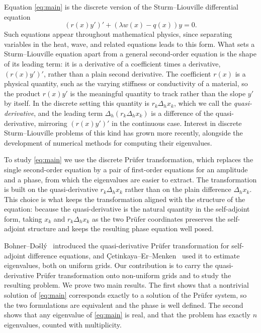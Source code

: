 \documentclass[12pt,reqno]{amsart}
\numberwithin{equation}{section}
\begin{document}
Equation \eqref{eq:main} is the discrete version of the Sturm--Liouville differential equation
\[
(r(x)y')' + \left(\lambda w(x) - q(x)\right) y = 0.
\]
Such equations appear throughout mathematical physics, since separating variables in the heat, wave, and related equations leads to this form. What sets a Sturm--Liouville equation apart from a general second-order equation is the shape of its leading term: it is a derivative of a coefficient times a derivative, $(r(x)y')'$, rather than a plain second derivative. The coefficient $r(x)$ is a physical quantity, such as the varying stiffness or conductivity of a material, so the product $r(x) y'$ is the meaningful quantity to track rather than the slope $y'$ by itself. In the discrete setting this quantity is $r_k \Delta_h x_k$, which we call the \emph{quasi-derivative}, and the leading term $\Delta_h(r_k \Delta_h x_k)$ is a difference of the quasi-derivative, mirroring $(r(x)y')'$ in the continuous case. Interest in discrete Sturm--Liouville problems of this kind has grown more recently, alongside the development of numerical methods for computing their eigenvalues.

To study \eqref{eq:main} we use the discrete Pr\"ufer transformation, which replaces the single second-order equation by a pair of first-order equations for an amplitude and a phase, from which the eigenvalues are easier to extract. The transformation is built on the quasi-derivative $r_k \Delta_h x_k$ rather than on the plain difference $\Delta_h x_k$. This choice is what keeps the transformation aligned with the structure of the equation: because the quasi-derivative is the natural quantity in the self-adjoint form, taking $x_k$ and $r_k \Delta_h x_k$ as the two Pr\"ufer coordinates preserves the self-adjoint structure and keeps the resulting phase equation well posed.

Bohner--Do\v{s}l\'y~\cite{bohner-dosly} introduced the quasi-derivative Pr\"ufer transformation for self-adjoint difference equations, and \c{C}etinkaya--Er--Menken~\cite{cetinkaya-er-menken} used it to estimate eigenvalues, both on uniform grids. Our contribution is to carry the quasi-derivative Pr\"ufer transformation onto non-uniform grids and to study the resulting problem. We prove two main results. The first shows that a nontrivial solution of \eqref{eq:main} corresponds exactly to a solution of the Pr\"ufer system, so the two formulations are equivalent and the phase is well defined. The second shows that any eigenvalue of \eqref{eq:main} is real, and that the problem has exactly $n$ eigenvalues, counted with multiplicity.
\end{document}

